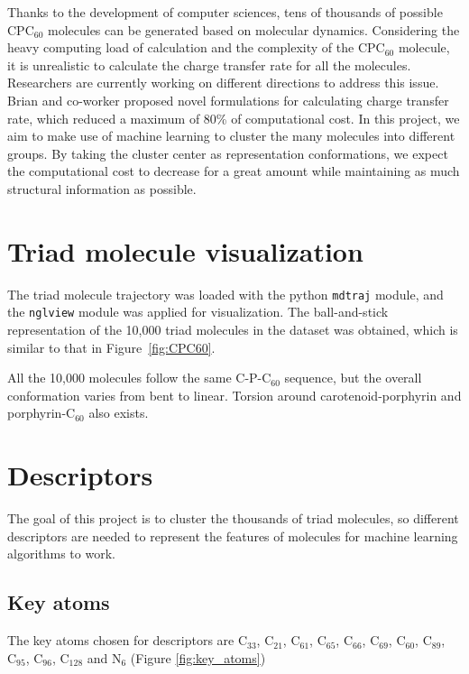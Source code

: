 \documentclass[a4paper]{article}
\begin{document}
Thanks to the development of computer sciences, tens of thousands of possible \(\text{CPC}_{60}\) molecules can be generated based on molecular dynamics. Considering the heavy computing load of calculation and the complexity of the \(\text{CPC}_{60}\) molecule, it is unrealistic to calculate the charge transfer rate for all the molecules. Researchers are currently working on different directions to address this issue. Brian and co-worker proposed novel formulations for calculating charge transfer rate, which reduced a maximum of 80\% of computational cost. In this project, we aim to make use of machine learning to cluster the many molecules into different groups. By taking the cluster center as representation conformations, we expect the computational cost to decrease for a great amount while maintaining as much structural information as possible.
\pagebreak

\section{Triad molecule visualization}
The triad molecule trajectory was loaded with the python \texttt{mdtraj} module, and the \texttt{nglview} module was applied for visualization. The ball-and-stick representation of the 10,000 triad molecules in the dataset was obtained, which is similar to that in Figure~\ref{fig:CPC60}. 

All the 10,000 molecules follow the same C-P-\(\text{C}_{60}\) sequence, but the overall conformation varies from bent to linear. Torsion around carotenoid-porphyrin and porphyrin-\(\text{C}_{60}\) also exists.

\section{Descriptors}
The goal of this project is to cluster the thousands of triad molecules, so different descriptors are needed to represent the features of molecules for machine learning algorithms to work. 

\subsection{Key atoms}
The key atoms chosen for descriptors are \(\text{C}_{33}\), \(\text{C}_{21}\), \(\text{C}_{61}\), \(\text{C}_{65}\), \(\text{C}_{66}\), \(\text{C}_{69}\), \(\text{C}_{60}\), \(\text{C}_{89}\), \(\text{C}_{95}\), \(\text{C}_{96}\), \(\text{C}_{128}\) and \(\text{N}_{6}\) (Figure \ref{fig:key_atoms})
\end{document}
